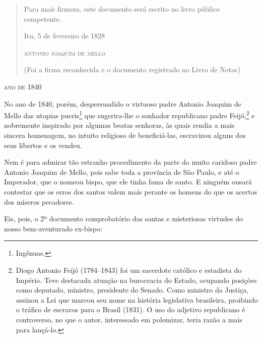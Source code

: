 \begin{quote}
Para mais firmeza, este documento será escrito no livro público
competente.

\begin{flushright}
Itu, 5 de fevereiro de 1828

\textsc{antonio joaquim de mello}

(Foi a firma reconhecida e o documento registrado no Livro de Notas)
\end{flushright}
\end{quote}

\textsc{ano de 1840}

No ano de 1840, porém, despersuadido o virtuoso padre Antonio Joaquim de
Mello das utopias pueris\footnote{Ingênuas.} que sugerira-lhe o
sonhador republicano padre Feijó,\footnote{Diogo Antonio Feijó
  (1784--1843) foi um sacerdote católico e estadista do Império. Teve
  destacada atuação na burocracia do Estado, ocupando posições como
  deputado, ministro, presidente do Senado. Como ministro da Justiça,
  assinou a Lei que marcou seu nome na história legislativa brasileira,
  proibindo o tráfico de escravos para o Brasil (1831). O uso do
  adjetivo republicano é controverso, no que o autor, interessado em
  polemizar, teria razão a mais para lançá-lo.} e nobremente inspirado
por algumas beatas senhoras, às quais rendia a mais sincera homenagem,
no intuito religioso de beneficiá-las, escravizou alguns dos seus
libertos e os vendeu.

Nem é para admirar tão estranho procedimento da parte do muito caridoso
padre Antonio Joaquim de Mello, pois sabe toda a província de São Paulo,
e até o Imperador, que o nomeou bispo, que ele tinha fama de santo. E
ninguém ousará contestar que os erros dos santos valem mais perante os
homens do que os acertos dos míseros pecadores.

Eis, pois, o 2º documento comprobatório das santas e misteriosas
virtudes do nosso bem-aventurado ex-bispo:

